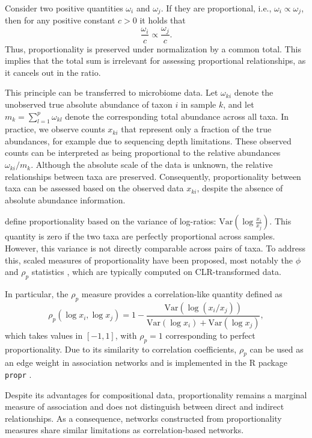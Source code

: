 \newpage
Consider two positive quantities $\omega_i$ and $\omega_j$. If they are proportional, i.e.,
$\omega_i \propto \omega_j$,
then for any positive constant $c > 0$ it holds that
\begin{equation}
\frac{\omega_i}{c} \propto \frac{\omega_j}{c}.
\end{equation}
Thus, proportionality is preserved under normalization by a common total. This implies that the total sum is irrelevant for assessing proportional relationships, as it cancels out in the ratio.

This principle can be transferred to microbiome data. Let $\omega_{ki}$ denote the unobserved true absolute abundance of taxon $i$ in sample $k$, and let $m_k = \sum_{l=1}^p \omega_{kl}$ denote the corresponding total abundance across all taxa. In practice, we observe counts $x_{ki}$ that represent only a fraction of the true abundances, for example due to sequencing depth limitations. These observed counts can be interpreted as being proportional to the relative abundances $\omega_{ki}/m_k$. Although the absolute scale of the data is unknown, the relative relationships between taxa are preserved. Consequently, proportionality between taxa can be assessed based on the observed data $x_{ki}$, despite the absence of absolute abundance information.

\citet{lovell2015proportionality} define proportionality based on the variance of log-ratios:
$\mathrm{Var}\!\left(\log\frac{x_i}{x_j}\right)$.
This quantity is zero if the two taxa are perfectly proportional across samples. However, this variance is not directly comparable across pairs of taxa. To address this, scaled measures of proportionality have been proposed, most notably the $\phi$ and $\rho_p$ statistics \citep{lovell2015proportionality, quinn2017propr}, which are typically computed on CLR-transformed data.

In particular, the $\rho_p$ measure provides a correlation-like quantity defined as
\begin{equation}
\label{eq:prop_rho}
\rho_p(\log x_i, \log x_j) = 1 - \frac{\mathrm{Var}(\log(x_i/x_j))}{\mathrm{Var}(\log x_i) + \mathrm{Var}(\log x_j)},
\end{equation}
which takes values in $[-1,1]$, with $\rho_p = 1$ corresponding to perfect proportionality. Due to its similarity to correlation coefficients, $\rho_p$ can be used as an edge weight in association networks and is implemented in the R package \texttt{propr} \citep{quinn2017propr}.

Despite its advantages for compositional data, proportionality remains a marginal measure of association and does not distinguish between direct and indirect relationships. As a consequence, networks constructed from proportionality measures share similar limitations as correlation-based networks.


